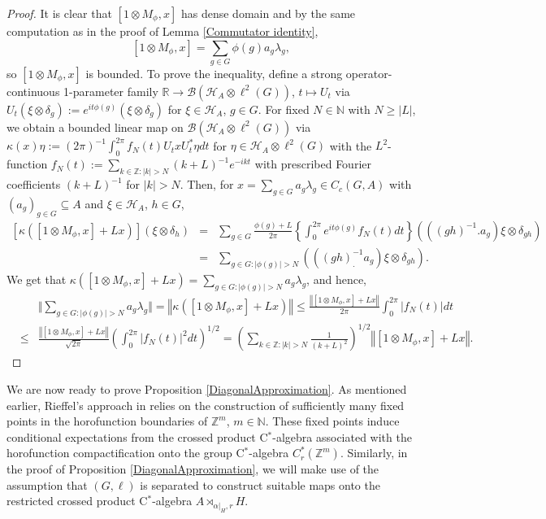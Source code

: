 \documentclass[a4paper,11pt,reqno]{amsart}
\numberwithin{equation}{section}
\numberwithin{equation}{section}
\theoremstyle{definition}
\theoremstyle{remark}
\theoremstyle{remark}
\begin{document}
\begin{proof} It is clear that $[1\otimes M_{\phi},x]$ has dense
domain and by the same computation as in the proof of Lemma \ref{Commutator identity},
\[
[1\otimes M_{\phi},x]=\sum_{g\in G}\phi(g)a_{g}\lambda_{g},
\]
so $[1\otimes M_{\phi},x]$ is bounded. To prove the inequality, define
a strong operator-continuous 1-parameter family $\mathbb{R}\rightarrow\mathcal{B}(\mathcal{H}_{A}\otimes\ell^{2}(G))$,
$t\mapsto U_{t}$ via $U_{t}(\xi\otimes\delta_{g}):=e^{it\phi(g)}(\xi\otimes\delta_{g})$
for $\xi\in\mathcal{H}_{A}$, $g\in G$. For fixed $N\in\mathbb{N}$
with $N\geq\left|L\right|$, we obtain a bounded linear map on $\mathcal{B}(\mathcal{H}_{A}\otimes\ell^{2}(G))$
via $\kappa(x)\eta:=(2\pi)^{-1}\int_{0}^{2\pi}f_{N}(t)U_{t}xU_{t}^{\ast}\eta dt$
for $\eta\in\mathcal{H}_{A}\otimes\ell^{2}(G)$ with the $L^{2}$-function
$f_{N}(t):=\sum_{k\in\mathbb{Z}:\left|k\right|>N}(k+L)^{-1}e^{-ikt}$
with prescribed Fourier coefficients $(k+L)^{-1}$ for $|k|>N$.
Then, for $x=\sum_{g\in G}a_{g}\lambda_{g}\in C_{c}(G,A)$ with $(a_{g})_{g\in G}\subseteq A$
and $\xi\in\mathcal{H}_{A}$, $h\in G$, 
\begin{eqnarray*}
\left[\kappa([1\otimes M_{\phi},x]+Lx)\right](\xi\otimes\delta_{h}) & = & \sum_{g\in G}\frac{\phi(g)+L}{2\pi}\left\{ \int_{0}^{2\pi}e^{it\phi(g)}f_{N}(t)dt\right\} \left(((gh)^{-1}.a_{g})\xi\otimes\delta_{gh}\right)\\
 & = & \sum_{g\in G:\left|\phi(g)\right|>N}\left(((gh)_{.}^{-1}a_{g})\xi\otimes\delta_{gh}\right).
\end{eqnarray*}
We get that $\kappa([1\otimes M_{\phi},x]+Lx)=\sum_{g\in G:\left|\phi(g)\right|>N}a_{g}\lambda_{g}$,
and hence, 
\begin{eqnarray*}
 &  & \Vert\sum_{g\in G:\left|\phi(g)\right|>N}a_{g}\lambda_{g}\Vert=\left\Vert \kappa([1\otimes M_{\phi},x]+Lx)\right\Vert \leq\frac{\left\Vert [1\otimes M_{\phi},x]+Lx\right\Vert }{2\pi}\int_{0}^{2\pi}\left|f_{N}(t)\right|dt\\
 & \leq & \frac{\left\Vert [1\otimes M_{\phi},x]+Lx\right\Vert }{\sqrt{2\pi}}\left(\int_{0}^{2\pi}\left|f_{N}(t)\right|^{2}dt\right)^{1/2}=\left(\sum_{k\in\mathbb{Z}:\left|k\right|>N}\frac{1}{(k+L)^{2}}\right)^{1/2}\left\Vert [1\otimes M_{\phi},x] + Lx \right\Vert .
\end{eqnarray*}
\end{proof}

We are now ready to prove Proposition \ref{DiagonalApproximation}.
As mentioned earlier, Rieffel's approach in \cite{Rieffel02} relies
on the construction of sufficiently many fixed points in the horofunction
boundaries of $\mathbb{Z}^{m}$, $m\in\mathbb{N}$. These fixed points
induce conditional expectations from the crossed product C$^{\ast}$-algebra
associated with the horofunction compactification onto the group C$^{\ast}$-algebra
$C_{r}^{\ast}(\mathbb{Z}^{m})$. Similarly, in the proof of Proposition
\ref{DiagonalApproximation}, we will make use of the assumption that
$(G,\ell)$ is separated to construct suitable maps onto the restricted
crossed product C$^{\ast}$-algebra $A\rtimes_{\alpha|_{H},r}H$.
\end{document}
